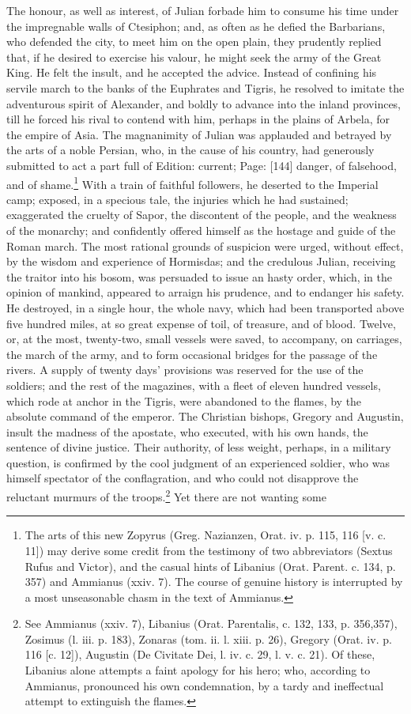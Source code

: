 The honour, as well as interest, of Julian forbade him to consume his time under the impregnable walls of Ctesiphon; and, as often as he defied the Barbarians, who defended the city, to meet him on the open plain, they prudently replied that, if he desired to exercise his valour, he might seek the army of the Great King. He felt the insult, and he accepted the advice. Instead of confining his servile march to the banks of the Euphrates and Tigris, he resolved to imitate the adventurous spirit of Alexander, and boldly to advance into the inland provinces, till he forced his rival to contend with him, perhaps in the plains of Arbela, for the empire of Asia. The magnanimity of Julian was applauded and betrayed by the arts of a noble Persian, who, in the cause of his country, had generously submitted to act a part full of Edition: current; Page: [144] danger, of falsehood, and of shame.\footnote{The arts of this new Zopyrus (Greg. Nazianzen, Orat. iv. p. 115, 116 [v. c. 11]) may derive some credit from the testimony of two abbreviators (Sextus Rufus and Victor), and the casual hints of Libanius (Orat. Parent. c. 134, p. 357) and Ammianus (xxiv. 7). The course of genuine history is interrupted by a most unseasonable chasm in the text of Ammianus.} With a train of faithful followers, he deserted to the Imperial camp; exposed, in a specious tale, the injuries which he had sustained; exaggerated the cruelty of Sapor, the discontent of the people, and the weakness of the monarchy; and confidently offered himself as the hostage and guide of the Roman march. The most rational grounds of suspicion were urged, without effect, by the wisdom and experience of Hormisdas; and the credulous Julian, receiving the traitor into his bosom, was persuaded to issue an hasty order, which, in the opinion of mankind, appeared to arraign his prudence, and to endanger his safety. He destroyed, in a single hour, the whole navy, which had been transported above five hundred miles, at so great expense of toil, of treasure, and of blood. Twelve, or, at the most, twenty-two, small vessels were saved, to accompany, on carriages, the march of the army, and to form occasional bridges for the passage of the rivers. A supply of twenty days\texthebrew{}’ provisions was reserved for the use of the soldiers; and the rest of the magazines, with a fleet of eleven hundred vessels, which rode at anchor in the Tigris, were abandoned to the flames, by the absolute command of the emperor. The Christian bishops, Gregory and Augustin, insult the madness of the apostate, who executed, with his own hands, the sentence of divine justice. Their authority, of less weight, perhaps, in a military question, is confirmed by the cool judgment of an experienced soldier, who was himself spectator of the conflagration, and who could not disapprove the reluctant murmurs of the troops.\footnote{See Ammianus (xxiv. 7), Libanius (Orat. Parentalis, c. 132, 133, p. 356,357), Zosimus (l. iii. p. 183), Zonaras (tom. ii. l. xiii. p. 26), Gregory (Orat. iv. p. 116 [c. 12]), Augustin (De Civitate Dei, l. iv. c. 29, l. v. c. 21). Of these, Libanius alone attempts a faint apology for his hero; who, according to Ammianus, pronounced his own condemnation, by a tardy and ineffectual attempt to extinguish the flames.} Yet there are not wanting some 